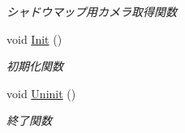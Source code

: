 \begin{DoxyCompactItemize}
\begin{DoxyCompactList}\small\item\em シャドウマップ用カメラ取得関数 \end{DoxyCompactList}\item 
void \mbox{\hyperlink{class_draw_common_data_ac111688b8426f23dd97b3fd31284fcb3}{Init}} ()
\begin{DoxyCompactList}\small\item\em 初期化関数 \end{DoxyCompactList}\item 
void \mbox{\hyperlink{class_draw_common_data_af19ce43b8e3eb24da78a8fa7d98d4315}{Uninit}} ()
\begin{DoxyCompactList}\small\item\em 終了関数 \end{DoxyCompactList}\end{DoxyCompactItemize}
